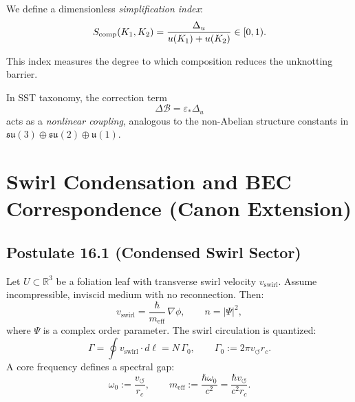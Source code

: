\documentclass[11pt]{article}
\begin{document}
        We define a dimensionless \emph{simplification index}:
        \[
            S_{\rm comp}(K_1,K_2)
            = \frac{\Delta_u}{u(K_1)+u(K_2)} \in [0,1).
        \]

        This index measures the degree to which composition
        reduces the unknotting barrier.

        \medskip

        In SST taxonomy, the correction term
        \[
            \Delta\mathcal B = \varepsilon_* \Delta_u
        \]
        acts as a \emph{nonlinear coupling},
        analogous to the non-Abelian structure constants
        in $\mathfrak{su}(3)\oplus\mathfrak{su}(2)\oplus\mathfrak{u}(1)$.




        \section{Swirl Condensation and BEC Correspondence (Canon Extension)}

        \subsection*{Postulate 16.1 (Condensed Swirl Sector)}
            Let $U \subset \mathbb R^3$ be a foliation leaf with transverse swirl velocity $v_{\text{swirl}}$.
            Assume incompressible, inviscid medium with no reconnection. Then:
            \begin{equation}
            v_{\text{swirl}} = \frac{\hbar}{m_{\text{eff}}}\,\nabla \phi,
            \qquad n = |\Psi|^2 ,
            \end{equation}
            where $\Psi$ is a complex order parameter. The swirl circulation is quantized:
            \begin{equation}
            \Gamma = \oint v_{\text{swirl}}\cdot d\ell = N\,\Gamma_0,
            \qquad \Gamma_0 := 2\pi v_\circlearrowleft r_c .
            \end{equation}
            A core frequency defines a spectral gap:
            \begin{equation}
            \omega_0 := \frac{v_\circlearrowleft}{r_c}, \qquad
            m_{\text{eff}} := \frac{\hbar \omega_0}{c^2}
            = \frac{\hbar v_\circlearrowleft}{c^2 r_c}.
            \end{equation}
\end{document}
